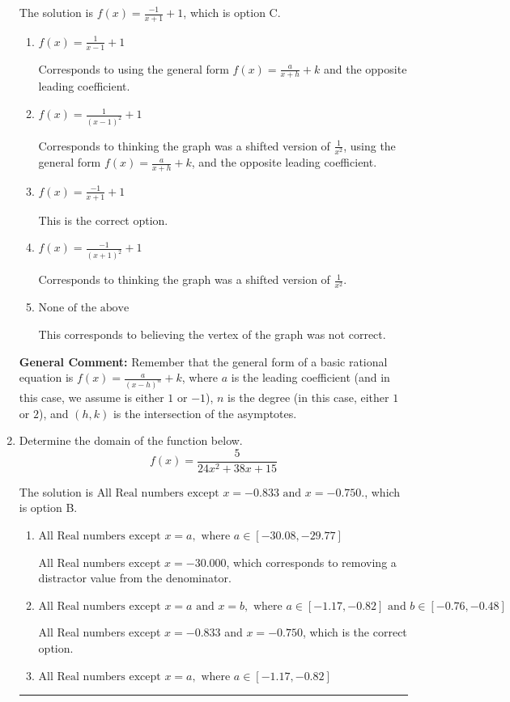 \documentclass{extbook}[14pt]
\newcommand{\litem}[1]{\item #1

\rule{\textwidth}{0.4pt}}
\begin{document}
\begin{enumerate}
{The solution is \( f(x) = \frac{-1}{x + 1} + 1 \), which is option C.\begin{enumerate}[label=\Alph*.]
\item \( f(x) = \frac{1}{x - 1} + 1 \)

Corresponds to using the general form $f(x) = \frac{a}{x+h}+k$ and the opposite leading coefficient.
\item \( f(x) = \frac{1}{(x - 1)^2} + 1 \)

Corresponds to thinking the graph was a shifted version of $\frac{1}{x^2}$, using the general form $f(x) = \frac{a}{x+h}+k$, and the opposite leading coefficient.
\item \( f(x) = \frac{-1}{x + 1} + 1 \)

This is the correct option.
\item \( f(x) = \frac{-1}{(x + 1)^2} + 1 \)

Corresponds to thinking the graph was a shifted version of $\frac{1}{x^2}$.
\item \( \text{None of the above} \)

This corresponds to believing the vertex of the graph was not correct.
\end{enumerate}

\textbf{General Comment:} Remember that the general form of a basic rational equation is $ f(x) = \frac{a}{(x-h)^n} + k$, where $a$ is the leading coefficient (and in this case, we assume is either $1$ or $-1$), $n$ is the degree (in this case, either $1$ or $2$), and $(h, k)$ is the intersection of the asymptotes.
}
\litem{
Determine the domain of the function below.
\[ f(x) = \frac{5}{24x^{2} +38 x + 15} \]

The solution is \( \text{All Real numbers except } x = -0.833 \text{ and } x = -0.750. \), which is option B.\begin{enumerate}[label=\Alph*.]
\item \( \text{All Real numbers except } x = a, \text{ where } a \in [-30.08, -29.77] \)

All Real numbers except $x = -30.000$, which corresponds to removing a distractor value from the denominator.
\item \( \text{All Real numbers except } x = a \text{ and } x = b, \text{ where } a \in [-1.17, -0.82] \text{ and } b \in [-0.76, -0.48] \)

All Real numbers except $x = -0.833$ and $x = -0.750$, which is the correct option.
\item \( \text{All Real numbers except } x = a, \text{ where } a \in [-1.17, -0.82] \)


\end{enumerate}}
\end{enumerate}
\end{document}
